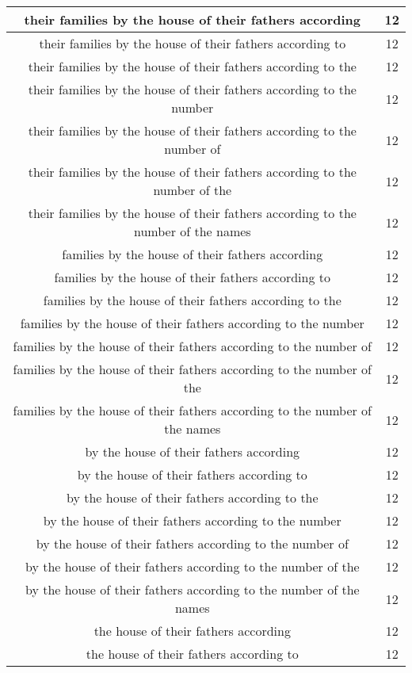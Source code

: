 \begin{center}
\begin{longtable}{|c|c|}
their families by the house of their fathers according & 12\\ \hline 
their families by the house of their fathers according to & 12\\ \hline 
their families by the house of their fathers according to the & 12\\ \hline 
their families by the house of their fathers according to the number & 12\\ \hline 
their families by the house of their fathers according to the number of & 12\\ \hline 
their families by the house of their fathers according to the number of the & 12\\ \hline 
their families by the house of their fathers according to the number of the names & 12\\ \hline 
families by the house of their fathers according & 12\\ \hline 
families by the house of their fathers according to & 12\\ \hline 
families by the house of their fathers according to the & 12\\ \hline 
families by the house of their fathers according to the number & 12\\ \hline 
families by the house of their fathers according to the number of & 12\\ \hline 
families by the house of their fathers according to the number of the & 12\\ \hline 
families by the house of their fathers according to the number of the names & 12\\ \hline 
by the house of their fathers according & 12\\ \hline 
by the house of their fathers according to & 12\\ \hline 
by the house of their fathers according to the & 12\\ \hline 
by the house of their fathers according to the number & 12\\ \hline 
by the house of their fathers according to the number of & 12\\ \hline 
by the house of their fathers according to the number of the & 12\\ \hline 
by the house of their fathers according to the number of the names & 12\\ \hline 
the house of their fathers according & 12\\ \hline 
the house of their fathers according to & 12\\ \hline 

\end{longtable}
\end{center}
